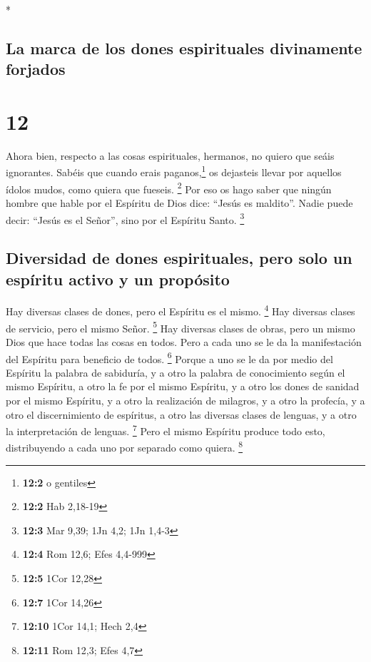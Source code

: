 \begin{paracol}{2}
\begin{otherlanguage}{english}
\end{otherlanguage}

\switchcolumn[0]*

\hypertarget{la-marca-de-los-dones-espirituales-divinamente-forjados}{%
\subsection{La marca de los dones espirituales divinamente
forjados}\label{la-marca-de-los-dones-espirituales-divinamente-forjados}}

\hypertarget{section-22}{%
\section{12}\label{section-22}}

 Ahora bien, respecto a las cosas espirituales, hermanos,
no quiero que seáis ignorantes.  Sabéis que cuando erais
paganos,\footnote{\textbf{12:2} o gentiles} os dejasteis llevar por
aquellos ídolos mudos, como quiera que fueseis. \footnote{\textbf{12:2}
  Hab 2,18-19}  Por eso os hago saber que ningún hombre
que hable por el Espíritu de Dios dice: ``Jesús es maldito''. Nadie
puede decir: ``Jesús es el Señor'', sino por el Espíritu Santo.
\footnote{\textbf{12:3} Mar 9,39; 1Jn 4,2; 1Jn 1,4-3}

\hypertarget{diversidad-de-dones-espirituales-pero-solo-un-espuxedritu-activo-y-un-propuxf3sito}{%
\subsection{Diversidad de dones espirituales, pero solo un espíritu
activo y un
propósito}\label{diversidad-de-dones-espirituales-pero-solo-un-espuxedritu-activo-y-un-propuxf3sito}}

 Hay diversas clases de dones, pero el Espíritu es el
mismo. \footnote{\textbf{12:4} Rom 12,6; Efes 4,4-999} 
Hay diversas clases de servicio, pero el mismo Señor. \footnote{\textbf{12:5}
  1Cor 12,28}  Hay diversas clases de obras, pero un mismo
Dios que hace todas las cosas en todos.  Pero a cada uno
se le da la manifestación del Espíritu para beneficio de todos.
\footnote{\textbf{12:7} 1Cor 14,26}  Porque a uno se le da
por medio del Espíritu la palabra de sabiduría, y a otro la palabra de
conocimiento según el mismo Espíritu,  a otro la fe por el
mismo Espíritu, y a otro los dones de sanidad por el mismo Espíritu,
 y a otro la realización de milagros, y a otro la
profecía, y a otro el discernimiento de espíritus, a otro las diversas
clases de lenguas, y a otro la interpretación de lenguas. \footnote{\textbf{12:10}
  1Cor 14,1; Hech 2,4}  Pero el mismo Espíritu produce
todo esto, distribuyendo a cada uno por separado como quiera.
\footnote{\textbf{12:11} Rom 12,3; Efes 4,7}


\end{paracol}
